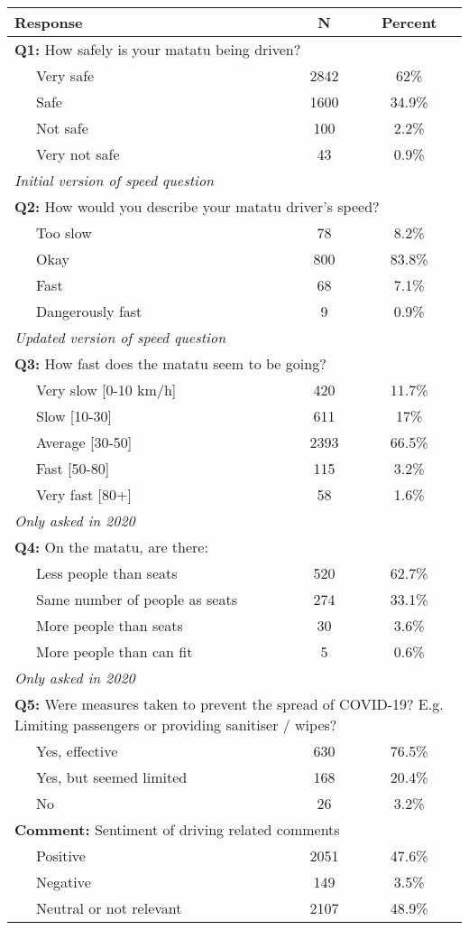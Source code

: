\begin{tabular}{lcc} 
\hline 
Response & N & Percent \\ 
\hline 
\multicolumn{3}{l}{\textbf{Q1:} How safely is your matatu being driven?} \\ 
~~~Very safe & 2842 & 62\% \\ 
 ~~~Safe & 1600 & 34.9\% \\ 
 ~~~Not safe & 100 & 2.2\% \\ 
 ~~~Very not safe & 43 & 0.9\% \\ 
\hline 
\multicolumn{3}{l}{\textit{Initial version of speed question}} \\ 
\multicolumn{3}{l}{\textbf{Q2:} How would you describe your matatu driver's speed?} \\ 
~~~Too slow & 78 & 8.2\% \\ 
 ~~~Okay & 800 & 83.8\% \\ 
 ~~~Fast & 68 & 7.1\% \\ 
 ~~~Dangerously fast & 9 & 0.9\% \\ 
\hline 
\multicolumn{3}{l}{\textit{Updated version of speed question}} \\ 
\multicolumn{3}{l}{\textbf{Q3:} How fast does the matatu seem to be going?} \\ 
~~~Very slow [0-10 km/h] & 420 & 11.7\% \\ 
 ~~~Slow [10-30] & 611 & 17\% \\ 
 ~~~Average [30-50] & 2393 & 66.5\% \\ 
 ~~~Fast [50-80] & 115 & 3.2\% \\ 
 ~~~Very fast [80+] & 58 & 1.6\% \\ 
\hline 
\multicolumn{3}{l}{\textit{Only asked in 2020}} \\ 
\multicolumn{3}{l}{\textbf{Q4:} On the matatu, are there:} \\ 
~~~Less people than seats & 520 & 62.7\% \\ 
 ~~~Same number of people as seats & 274 & 33.1\% \\ 
 ~~~More people than seats & 30 & 3.6\% \\ 
 ~~~More people than can fit & 5 & 0.6\% \\ 
\hline 
\multicolumn{3}{l}{\textit{Only asked in 2020}} \\ 
\multicolumn{3}{p{8cm}}{\textbf{Q5:} Were measures taken to prevent the spread of COVID-19? E.g. Limiting passengers or providing sanitiser / wipes?} \\ 
~~~Yes, effective & 630 & 76.5\% \\ 
 ~~~Yes, but seemed limited & 168 & 20.4\% \\ 
 ~~~No & 26 & 3.2\% \\ 
\hline 
\multicolumn{3}{p{8cm}}{\textbf{Comment:} Sentiment of driving related comments} \\ 
~~~Positive & 2051 & 47.6\% \\ 
 ~~~Negative & 149 & 3.5\% \\ 
 ~~~Neutral or not relevant & 2107 & 48.9\% \\ 
\hline 
\end{tabular}